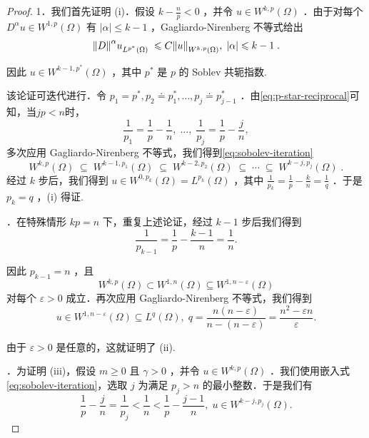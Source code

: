 \begin{proof}
1．我们首先证明 (i)．假设 $k - \frac{n}{p} < 0$ ，并令 $u \in  {W}^{k,p}\left( \Omega \right)$ ．由于对每个 ${D}^{\alpha }u \in  {W}^{1,p}\left( \Omega \right)$ 有 $\left| \alpha \right|  \leq  k - 1$ ，Gagliardo-Nirenberg 不等式给出
\[
{\norm{D}^{\alpha }u}_{{L}^{{p}^{ * }}\left( \Omega \right) }\; \leqslant  C\norm{u}_{{W}^{k,p}\left( \Omega \right) },\;\left| \alpha \right|  \leqslant  k - 1\;.
\]

因此 $u \in  {W}^{k - 1,{p}^{ * }}\left( \Omega \right)$ ，其中 ${p}^{ * }$ 是 $p$ 的 Soblev 共轭指数.

该论证可迭代进行．令 ${p}_{1} = {p}^{ * },{p}_{2} \doteq  {p}_{1}^{ * },\ldots ,{p}_{j} \doteq  {p}_{j - 1}^{ * }$ ．由\eqref{eq:p-star-reciprocal}可知，当${jp} < n$时，
\[
\frac{1}{{p}_{1}} = \frac{1}{p} - \frac{1}{n},\;\ldots ,\;\frac{1}{{p}_{j}} = \frac{1}{p} - \frac{j}{n},
\]
多次应用 Gagliardo-Nirenberg 不等式，我们得到\eqref{eq:sobolev-iteration}
\begin{equation}\tag{8.70}\label{eq:sobolev-iteration}
{W}^{k,p}(\Omega )\; \subseteq  \;{W}^{k - 1,{p}_{1}}(\Omega )\; \subseteq  \;{W}^{k - 2,{p}_{2}}(\Omega )\; \subseteq  \;\cdots \; \subseteq  \;{W}^{k - j,{p}_{j}}(\Omega )\;.
\end{equation}
经过 $k$ 步后，我们得到 $u \in  {W}^{0,{p}_{k}}\left( \Omega \right)  = {L}^{{p}_{k}}\left( \Omega \right)$ ，其中 $\frac{1}{{p}_{k}} = \frac{1}{p} - \frac{k}{n} = \frac{1}{q}$ ．于是 ${p}_{k} = q$ ，(i) 得证.

．在特殊情形 ${kp} = n$ 下，重复上述论证，经过 $k - 1$ 步后我们得到
\[
\frac{1}{{p}_{k - 1}} = \frac{1}{p} - \frac{k - 1}{n} = \frac{1}{n}.
\]

因此 ${p}_{k - 1} = n$ ，且
\[
{W}^{k,p}\left( \Omega \right)  \subset  {W}^{1,n}\left( \Omega \right)  \subseteq  {W}^{1,n - \varepsilon }\left( \Omega \right)
\]
对每个 $\varepsilon  > 0$ 成立．再次应用 Gagliardo-Nirenberg 不等式，我们得到
\[
u \in  {W}^{1,n - \varepsilon }\left( \Omega \right)  \subseteq  {L}^{q}\left( \Omega \right) ,\;q = \frac{n\left( {n - \varepsilon }\right) }{n - \left( {n - \varepsilon }\right) } = \frac{{n}^{2} - {\varepsilon n}}{\varepsilon }.
\]

由于 $\varepsilon  > 0$ 是任意的，这就证明了 (ii).

．为证明 (iii)，假设 $m \geq  0$ 且 $\gamma  > 0$ ，并令 $u \in  {W}^{k,p}\left( \Omega \right)$ ．我们使用嵌入式\eqref{eq:sobolev-iteration}，选取 $j$ 为满足 ${p}_{j} > n$ 的最小整数．于是我们有
\[
\frac{1}{p} - \frac{j}{n} = \frac{1}{{p}_{j}} < \frac{1}{n} < \frac{1}{p} - \frac{j - 1}{n},\;u \in  {W}^{k - j,{p}_{j}}\left( \Omega \right) .
\]


\end{proof}
